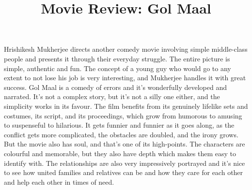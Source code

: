 \documentclass[12pt, a4paper]{article}
\title{Movie Review: Gol Maal}
\author{}
\date{}
\begin{document}
\maketitle
Hrishikesh Mukherjee directs another comedy movie involving simple middle-class people and presents it through their everyday struggle. The entire picture is simple, authentic and fun. The concept of a young guy who would go to any extent to not lose his job is very interesting, and Mukherjee handles it with great success. Gol Maal is a comedy of errors and it's wonderfully developed and narrated. It's not a complex story, but it's not a silly one either, and the simplicity works in its favour. The film benefits from its genuinely lifelike sets and costumes, its script, and its proceedings, which grow from humorous to amusing to suspenseful to hilarious. It gets funnier and funnier as it goes along, as the conflict gets more complicated, the obstacles are doubled, and the irony grows. But the movie also has soul, and that's one of its high-points. The characters are colourful and memorable, but they also have depth which makes them easy to identify with. The relationships are also very impressively portrayed and it's nice to see how united families and relatives can be and how they care for each other and help each other in times of need.\par
\end{document}
